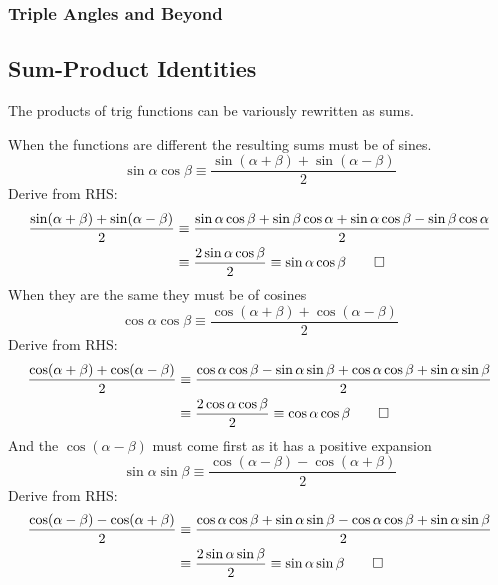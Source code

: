 \documentclass[fleqn,a4paper,11pt]{article}
\begin{document}
    \subsubsection{Triple Angles and Beyond}

    \subsection{Sum-Product Identities} \label{sec:trig_sum_product}

    The products of trig functions can be variously rewritten as sums.

    When the functions are different the resulting sums must be of sines.
    \begin{equation}
    \sin \alpha \cos \beta \equiv
        \frac{\sin(\alpha + \beta) + \sin(\alpha - \beta)} 2
    \end{equation}
    Derive from RHS:
    \begin{align*}
    \frac{\sin(\alpha + \beta) + \sin(\alpha - \beta)} 2 &\equiv
     \frac{\sin \alpha \cos \beta + \sin \beta \cos \alpha +
           \sin \alpha \cos \beta - \sin \beta \cos \alpha} 2 \\
    &\equiv \frac{2 \sin \alpha \cos \beta} 2 \equiv \sin \alpha \cos \beta \qed
    \end{align*}
    When they are the same they must be of cosines
    \begin{equation}
    \cos \alpha \cos \beta \equiv
     \frac{\cos(\alpha + \beta) + \cos(\alpha - \beta)} 2
    \end{equation}
    Derive from RHS:
    \begin{align*}
    \frac{\cos(\alpha + \beta) + \cos(\alpha - \beta)} 2 &\equiv
     \frac{\cos \alpha \cos \beta - \sin \alpha \sin \beta +
           \cos \alpha \cos \beta + \sin \alpha \sin \beta} 2 \\
    &\equiv \frac{2 \cos \alpha \cos \beta} 2 \equiv \cos \alpha \cos \beta \qed
    \end{align*}
    And the \(\cos(\alpha - \beta)\) must come first as it has a positive
    expansion
    \begin{equation}
    \sin \alpha \sin \beta \equiv
     \frac{\cos(\alpha - \beta) - \cos(\alpha + \beta)} 2
    \end{equation}
    Derive from RHS:
    \begin{align*}
    \frac{\cos(\alpha - \beta) - \cos(\alpha + \beta)} 2 &\equiv
     \frac{\cos \alpha \cos \beta + \sin \alpha \sin \beta -
           \cos \alpha \cos \beta + \sin \alpha \sin \beta} 2 \\
    &\equiv \frac{2 \sin \alpha \sin \beta} 2 \equiv \sin \alpha \sin \beta \qed
    \end{align*}
\end{document}
